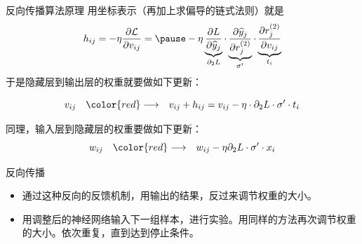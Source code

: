 
\begin{frame}

\begin{block}{反向传播算法原理}
用坐标表示（再加上求偏导的链式法则）就是
$$h_{ij} = -\eta\dfrac{\partial\mathcal{L}}{\partial v_{ij}} = \pause -\eta \underbrace{\dfrac{\partial L}{\partial \widehat{y}_j}}_{\partial_2 L} \cdot \underbrace{\dfrac{\partial \widehat{y}_j}{\partial r_j^{(2)}}}_{\sigma'} \cdot \underbrace{\dfrac{\partial r_j^{(2)}}{\partial v_{ij}}}_{t_i}$$
于是隐藏层到输出层的权重就要做如下更新：

\pause

$$v_{ij} \quad{\color{red}\longrightarrow\quad} v_{ij} + h_{ij} = v_{ij} - \eta \cdot \partial_2 L \cdot \sigma' \cdot t_i$$


\pause

同理，输入层到隐藏层的权重要做如下更新：
$$w_{ij} \quad{\color{red}\longrightarrow\quad} w_{ij} - \eta \partial_2 L \cdot \sigma' \cdot x_i$$
\end{block}

\end{frame}


\begin{frame}

\begin{block}{反向传播}
\begin{itemize}
\item 通过这种反向的反馈机制，用输出的结果，反过来调节权重的大小。
\vspace{1em}
\pause
\item 用调整后的神经网络输入下一组样本，进行实验。用同样的方法再次调节权重的大小。依次重复，直到达到停止条件。
\end{itemize}

\end{block}

\end{frame}


